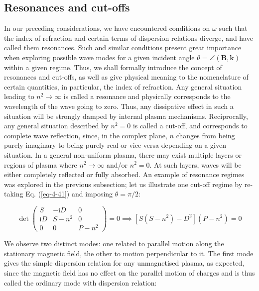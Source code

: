 \subsection{Resonances and cut-offs}

In our preceding considerations, we have encountered conditions on $\omega$ such that the index of refraction and certain terms of dispersion relations diverge, and have called them resonances. Such and similar conditions present great importance when exploring possible wave modes for a given incident angle $\theta=\angle(\mathbf{B},\mathbf{k})$ within a given regime. Thus, we shall formally introduce the concept of resonances and cut-offs, as well as give physical meaning to the nomenclature of certain quantities, in particular, the index of refraction. Any general situation leading to $n^2\to\infty$ is called a resonance and physically corresponds to the wavelength of the wave going to zero. Thus, any dissipative effect in such a situation will be strongly damped by internal plasma mechanisms. Reciprocally, any general situation described by $n^2=0$ is called a cut-off, and corresponds to complete wave reflection, since, in the complex plane, $n$ changes from being purely imaginary to being purely real or vice versa depending on a given situation. In a general non-uniform plasma, there may exist multiple layers or regions of plasma where $n^2\to\infty$ and/or $n^2=0$. At such layers, waves will be either completely reflected or fully absorbed. An example of resonance regimes was explored in the previous subsection; let us illustrate one cut-off regime by re-taking Eq. (\ref{eq-4-41}) and imposing $\theta=\pi/2$:

\begin{equation}
    \det{\begin{pmatrix}
        S&-\mathrm{i}D&0\\
        \mathrm{i}D&S-n^2&0\\
        0&0&P-n^2
    \end{pmatrix}}=0\implies\left[S(S-n^2)-D^2\right](P-n^2)=0
\end{equation}

We observe two distinct modes: one related to parallel motion along the stationary magnetic field, the other to motion perpendicular to it. The first mode gives the simple dispersion relation for any unmagnetised plasma, as expected, since the magnetic field has no effect on the parallel motion of charges and is thus called the ordinary mode with dispersion relation:

